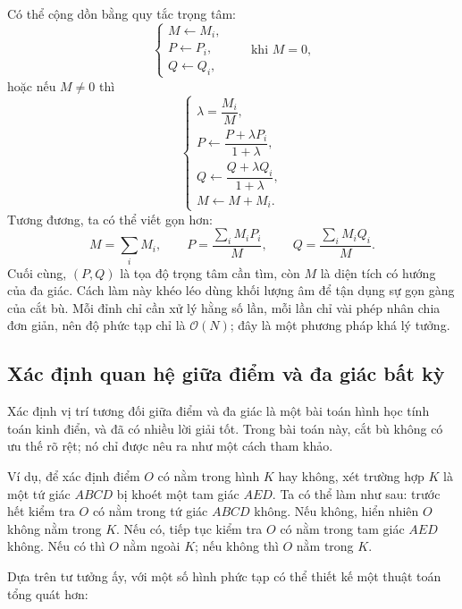 \documentclass[11pt]{article}
\newcommand{\Oh}{\mathcal{O}}
\begin{document}
Có thể cộng dồn bằng quy tắc trọng tâm:
\[
\begin{cases}
  M\leftarrow M_i,\\
  P\leftarrow P_i,\\
  Q\leftarrow Q_i,
\end{cases}
\qquad\text{khi }M=0,
\]
hoặc nếu $M\ne0$ thì
\[
\begin{cases}
  \lambda=\dfrac{M_i}{M},\\[0.8em]
  P\leftarrow\dfrac{P+\lambda P_i}{1+\lambda},\\[1em]
  Q\leftarrow\dfrac{Q+\lambda Q_i}{1+\lambda},\\[1em]
  M\leftarrow M+M_i.
\end{cases}
\]
Tương đương, ta có thể viết gọn hơn:
\[
  M=\sum_i M_i,\qquad
  P=\frac{\sum_i M_iP_i}{M},\qquad
  Q=\frac{\sum_i M_iQ_i}{M}.
\]
Cuối cùng, $(P,Q)$ là tọa độ trọng tâm cần tìm, còn $M$ là diện tích có hướng
của đa giác. Cách làm này khéo léo dùng khối lượng âm để tận dụng sự gọn gàng
của cắt bù. Mỗi đỉnh chỉ cần xử lý hằng số lần, mỗi lần chỉ vài phép nhân
chia đơn giản, nên độ phức tạp chỉ là $\Oh(N)$; đây là một phương pháp khá lý
tưởng.

\subsection{Xác định quan hệ giữa điểm và đa giác bất kỳ}

Xác định vị trí tương đối giữa điểm và đa giác là một bài toán hình học tính
toán kinh điển, và đã có nhiều lời giải tốt. Trong bài toán này, cắt bù không
có ưu thế rõ rệt; nó chỉ được nêu ra như một cách tham khảo.

Ví dụ, để xác định điểm $O$ có nằm trong hình $K$ hay không, xét trường hợp
$K$ là một tứ giác $ABCD$ bị khoét một tam giác $AED$. Ta có thể làm như sau:
trước hết kiểm tra $O$ có nằm trong tứ giác $ABCD$ không. Nếu không, hiển
nhiên $O$ không nằm trong $K$. Nếu có, tiếp tục kiểm tra $O$ có nằm trong tam
giác $AED$ không. Nếu có thì $O$ nằm ngoài $K$; nếu không thì $O$ nằm trong
$K$.

Dựa trên tư tưởng ấy, với một số hình phức tạp có thể thiết kế một thuật toán
tổng quát hơn:
\end{document}
